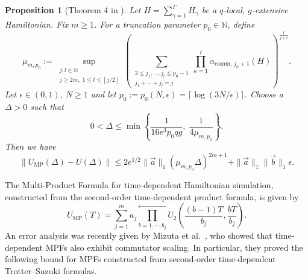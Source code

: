 \documentclass[10pt,reqno]{article}
\numberwithin{equation}{section}
\theoremstyle{plain}
\newtheorem{prop}[thm]{Proposition}
\theoremstyle{definition}
\begin{document}
\begin{prop}[Theorem 4 in \cite{mizuta2025commutatorscalinghamiltoniansimulation}]
\label{mizuta-time-indep-short}
Let $H=\sum_{\gamma=1}^{\Gamma} H_\gamma$ be a $q$-local, $g$-extensive Hamiltonian. Fix $m \ge 1$.  For a truncation parameter $p_0 \in \mathbb{N}$, define
\begin{equation}\label{mu-m-p0}
\mu_{m,p_0} := \sup_{\substack{j,l \in \mathbb{N} \\ j \ge 2m,\; 1 \le l \le \left\lfloor j/2 \right\rfloor}} \left( \sum_{\substack{2 \le j_1,\ldots,j_l \le p_0-1 \\ j_1+\cdots+j_l = j}} \prod_{\kappa=1}^{l} \alpha_{\mathrm{comm},\,j_\kappa+1}(H) \right)^{\frac{1}{j+l}}.
\end{equation}
Let $\epsilon \in (0,1)$, $N \geq 1$ and let $p_0 := p_0(N,\epsilon) = \lceil \log(3N/\epsilon) \rceil $. Choose a $\Delta > 0$ such that
\begin{equation}
0 < \Delta \le \min\left\{ \frac{1}{16 e^3 p_0 q g}, \;\frac{1}{4 \mu_{m,p_0}} \right\}.
\label{eq:mizuta_tau_condition}
\end{equation}
Then we have
\begin{equation}
\left\| U_{\operatorname{MP}} (\Delta) - U(\Delta) \right\| \le 2 e^{1/2} \|\vec{a} \|_1 ( \mu_{m,p_0} \Delta )^{2m+1} + \|\vec a\|_1 \|\vec b\|_1 \epsilon.
\label{eq:mizuta_error}
\end{equation}
\end{prop}

The Multi-Product Formula for time-dependent Hamiltonian simulation, constructed from the second-order time-dependent product formula, is given by
\begin{equation}\label{time-dep-2MPF}
U_{\operatorname{MP}}(T) = \sum_{j=1}^{m} a_j \overset{\longleftarrow}{\prod_{b=1,\cdots,b_j}} U_{2}\left( \frac{(b - 1)T}{b_j}, \frac{bT}{b_j} \right).
\end{equation}
An error analysis was recently given by Mizuta et al.~\cite{mizuta2024MPFtimedep}, who showed that time-dependent MPFs also exhibit commutator scaling. In particular, they proved the following bound for MPFs constructed from second-order time-dependent Trotter--Suzuki formulas.
\end{document}
